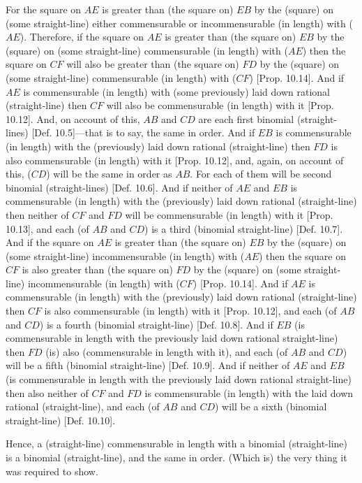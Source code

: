 \begin{Parallel}{}{}
{For the square on $AE$ is  greater than (the square on) $EB$ by the
(square) on (some straight-line) either commensurable or incommensurable
(in length) with ($AE$).  Therefore, if the square on $AE$ is greater than (the square on)
$EB$ by the (square) on (some straight-line) commensurable (in length)
with ($AE$) then the square on $CF$ will also be greater than (the square on)
$FD$ by the (square) on (some straight-line) commensurable (in length)
with ($CF$) [Prop. 10.14]. And if $AE$
is commensurable (in length) with (some previously) laid down rational (straight-line) then $CF$ will also be commensurable (in length) with it [Prop. 10.12]. And, on account of this,
$AB$ and $CD$ are each first binomial (straight-lines) [Def. 10.5]---that is to say, the same  in order.
And if $EB$ is commensurable (in length) with the (previously) laid down
rational (straight-line) then $FD$ is also  commensurable (in length) with it [Prop. 10.12], and, again, on account of this,
($CD$) will be  the same in order as $AB$. For each of them will be second
binomial (straight-lines) [Def. 10.6]. And if neither
of $AE$ and $EB$ is commensurable (in length) with the (previously) laid down
rational (straight-line) then neither of $CF$ and $FD$ will be commensurable (in length)
with it [Prop. 10.13], and each (of $AB$ and $CD$) is a third (binomial straight-line) [Def. 10.7]. And if the square on $AE$
is greater than (the square on) $EB$ by the (square) on (some straight-line)
incommensurable (in length) with ($AE$) then the square on $CF$
is also greater than (the square on) $FD$ by the (square) on (some straight-line) incommensurable (in length) with ($CF$) [Prop. 10.14]. And if $AE$ is commensurable
(in length) with the (previously) laid down rational (straight-line) then $CF$ is also
commensurable (in  length) with it [Prop. 10.12], 
and each (of $AB$ and $CD$) is a fourth (binomial straight-line)
[Def. 10.8]. And
if $EB$ (is commensurable in length with the previously laid down rational
straight-line) then $FD$ (is) also (commensurable in length with it), and
each (of $AB$ and $CD$) will be a fifth (binomial straight-line) [Def. 10.9]. And if neither of $AE$ and  $EB$
(is commensurable in length with the previously laid down rational
straight-line) then also neither of $CF$ and $FD$ is   commensurable (in length) with the laid down rational (straight-line), and
each (of $AB$ and $CD$) will be a sixth (binomial straight-line) [Def. 10.10].

Hence, a (straight-line) commensurable in length with a binomial (straight-line) is a binomial (straight-line), and the same in order. (Which is) the
very thing it was required to show.}
\end{Parallel}

